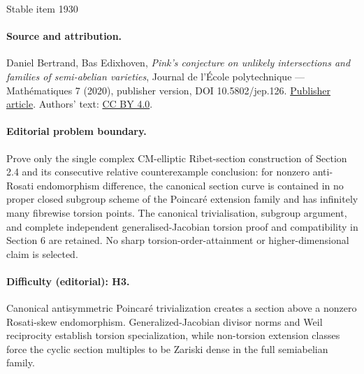\documentclass[11pt]{article}
\begin{document}
\begin{center}{\Large Stable item 1930}\end{center}
\paragraph{Source and attribution.}
Daniel Bertrand, Bas Edixhoven, \emph{Pink’s conjecture on unlikely intersections and families of semi-abelian varieties}, Journal de l’École polytechnique — Mathématiques 7 (2020), publisher version, DOI 10.5802/jep.126. \href{https://jep.centre-mersenne.org/articles/10.5802/jep.126/}{Publisher article}. Authors' text: \href{https://creativecommons.org/licenses/by/4.0/}{CC BY 4.0}.
\paragraph{Editorial problem boundary.}
Prove only the single complex CM-elliptic Ribet-section construction of Section 2.4 and its consecutive relative counterexample conclusion: for nonzero anti-Rosati endomorphism difference, the canonical section curve is contained in no proper closed subgroup scheme of the Poincaré extension family and has infinitely many fibrewise torsion points. The canonical trivialisation, subgroup argument, and complete independent generalised-Jacobian torsion proof and compatibility in Section 6 are retained. No sharp torsion-order-attainment or higher-dimensional claim is selected.
\paragraph{Difficulty (editorial): H3.}
Canonical antisymmetric Poincaré trivialization creates a section above a nonzero Rosati-skew endomorphism. Generalized-Jacobian divisor norms and Weil reciprocity establish torsion specialization, while non-torsion extension classes force the cyclic section multiples to be Zariski dense in the full semiabelian family.
\end{document}
